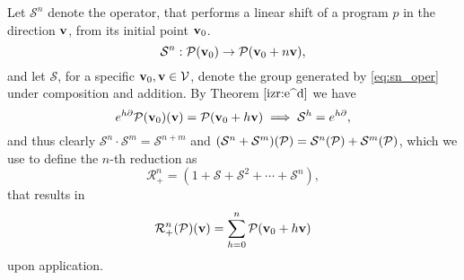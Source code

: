Let $\mathcal{S}^n$ denote the operator, that performs a linear shift of a program $p$ in the direction $\mathbf{v}$, from its initial point $\mathbf{v}_0$.
   \begin{equation}\label{eq:sn_oper}
   \mathcal{S}^n:\mathcal{P}(\mathbf{v}_0)\to \mathcal{P}(\mathbf{v}_0+n\mathbf{v}),
   \end{equation}  
and let $\mathcal{S}$, for a specific $\mathbf{v}_0, \mathbf{v}\in \mathcal{V}$, denote the group generated by \eqref{eq:sn_oper} under composition and addition. By Theorem $\ref{izr:e^d}$ we have
  \begin{equation}\label{eq:sn=ed}
e^{h\partial}\mathcal{P}(\mathbf{v}_0)(\mathbf{v})=\mathcal{P}(\mathbf{v}_0+h\mathbf{v})\implies \mathcal{S}^h=e^{h\partial},
  \end{equation}
and thus clearly $\mathcal{S}^n\cdot\mathcal{S}^m=\mathcal{S}^{n+m}$ and $(\mathcal{S}^n+\mathcal{S}^m)(\mathcal{P})=\mathcal{S}^n(\mathcal{P})+\mathcal{S}^m(\mathcal{P})$, which we use to define the $n$-th reduction as
$$\mathcal{R}_+^n=(1+\mathcal{S}+\mathcal{S}^2+\cdots+\mathcal{S}^n),$$
that results in
   $$\mathcal{R}^n_+(\mathcal{P})(\mathbf{v})=\sum\limits_{h=0}^{n}\mathcal{P}(\mathbf{v}_0+h\mathbf{v})$$
upon application.


